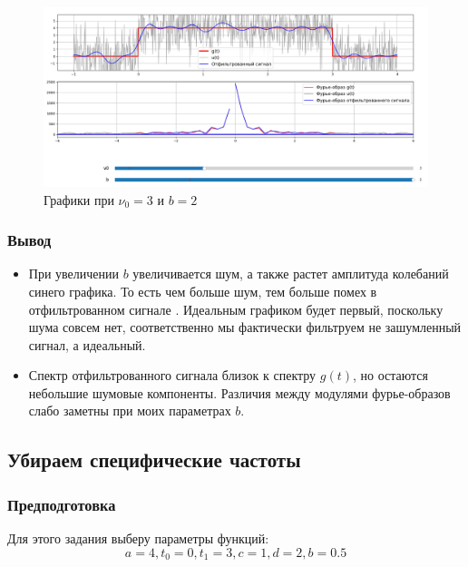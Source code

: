 \documentclass[a4paper,12pt]{article}
\begin{document}
\begin{figure}[H]  
    \centering
    \includegraphics[width=1\textwidth]{../images/1.1_2_3.png}
    \caption{Графики при \(\nu_0 = 3\) и \(b = 2\)}  
    \label{fig:my_image}  
\end{figure}

\subsubsection{Вывод}

\begin{itemize}
    \item При увеличении \(b\) увеличивается шум, а также растет амплитуда колебаний
    синего графика. То есть чем больше шум, тем больше помех в отфильтрованном сигнале
    . Идеальным графиком будет первый, поскольку шума совсем нет, 
    соответственно мы фактически фильтруем не зашумленный сигнал, а идеальный.

    \item Спектр отфильтрованного сигнала близок к спектру \(g(t)\), но остаются небольшие шумовые компоненты.
    Различия между модулями фурье-образов слабо заметны при моих параметрах \(b\).

\end{itemize}





\subsection{Убираем специфические частоты}

\subsubsection{Предподготовка}

Для этого задания выберу параметры функций:
\[
a = 4, t_0 = 0, t_1 = 3, c = 1, d = 2, b = 0.5
\]
\end{document}
